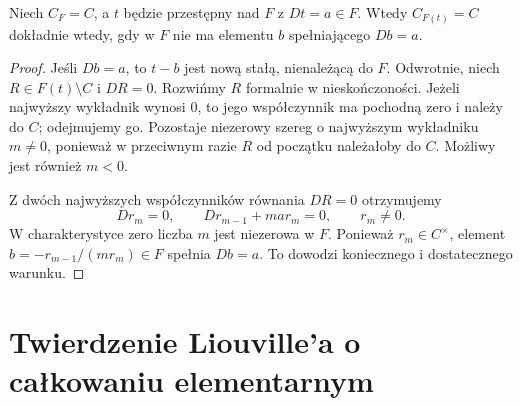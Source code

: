 \begin{lemat}
Niech $C_F=C$, a $t$ będzie przestępny nad $F$ z $Dt=a\in F$. Wtedy $C_{F(t)}=C$ dokładnie wtedy, gdy w $F$ nie ma elementu $b$ spełniającego $Db=a$.
\end{lemat}
\begin{proof}
Jeśli $Db=a$, to $t-b$ jest nową stałą, nienależącą do $F$. Odwrotnie, niech $R\in F(t)\setminus C$ i $DR=0$. Rozwińmy $R$ formalnie w nieskończoności. Jeżeli najwyższy wykładnik wynosi $0$, to jego współczynnik ma pochodną zero i należy do $C$; odejmujemy go. Pozostaje niezerowy szereg o najwyższym wykładniku $m\ne0$, ponieważ w przeciwnym razie $R$ od początku należałoby do $C$. Możliwy jest również $m<0$.

Z dwóch najwyższych współczynników równania $DR=0$ otrzymujemy
\[
Dr_m=0,\qquad Dr_{m-1}+m a r_m=0,\qquad r_m\ne0.
\]
W charakterystyce zero liczba $m$ jest niezerowa w $F$. Ponieważ $r_m\in C^\times$, element $b=-r_{m-1}/(mr_m)\in F$ spełnia $Db=a$. To dowodzi koniecznego i dostatecznego warunku.
\end{proof}

\section{Twierdzenie Liouville'a o całkowaniu elementarnym}

